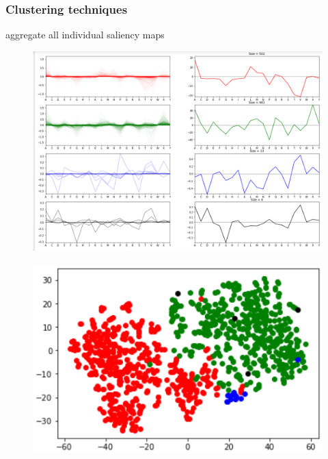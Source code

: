 			
	
		\subsubsection*{Clustering techniques}
		aggregate all individual saliency maps %
		
		\begin{figure}
\centering
\includegraphics[width=1\linewidth]{Figures/clusters}
\caption{}
\label{fig:clusters}
\end{figure}

\begin{figure}
\centering
\includegraphics[width=0.7\linewidth]{tsne}
\caption{}
\label{fig:tsne}
\end{figure}

